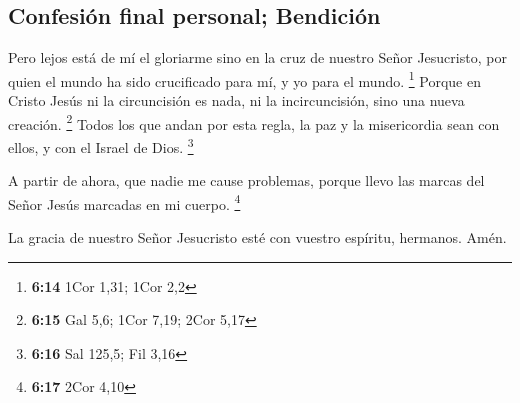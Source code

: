 \hypertarget{confesiuxf3n-final-personal-bendiciuxf3n}{%
\subsection{Confesión final personal;
Bendición}\label{confesiuxf3n-final-personal-bendiciuxf3n}}

 Pero lejos está de mí el gloriarme sino en la cruz de
nuestro Señor Jesucristo, por quien el mundo ha sido crucificado para
mí, y yo para el mundo. \footnote{\textbf{6:14} 1Cor 1,31; 1Cor 2,2}
 Porque en Cristo Jesús ni la circuncisión es nada, ni la
incircuncisión, sino una nueva creación. \footnote{\textbf{6:15} Gal
  5,6; 1Cor 7,19; 2Cor 5,17}  Todos los que andan por
esta regla, la paz y la misericordia sean con ellos, y con el Israel de
Dios. \footnote{\textbf{6:16} Sal 125,5; Fil 3,16}

 A partir de ahora, que nadie me cause problemas, porque
llevo las marcas del Señor Jesús marcadas en mi cuerpo. \footnote{\textbf{6:17}
  2Cor 4,10}

 La gracia de nuestro Señor Jesucristo esté con vuestro
espíritu, hermanos. Amén.
